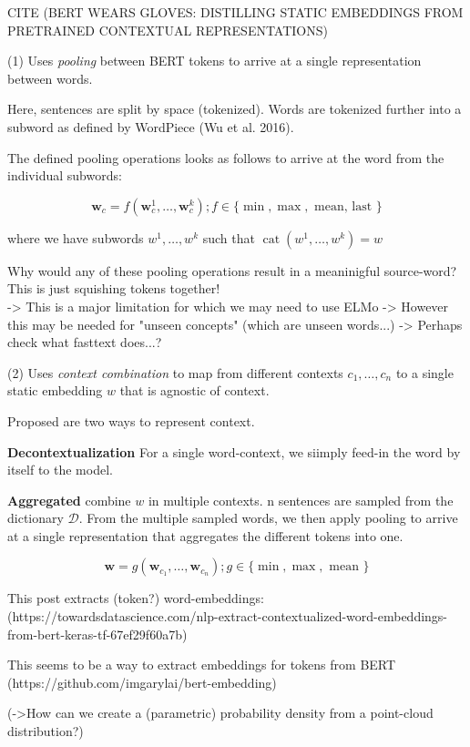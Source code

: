 \documentclass[a4paper,12pt,twoside,openright]{report}
\begin{document}
CITE (BERT WEARS GLOVES: DISTILLING STATIC EMBEDDINGS FROM PRETRAINED CONTEXTUAL REPRESENTATIONS)

(1) Uses \textit{pooling} between BERT tokens to arrive at a single representation between words.

Here, sentences are split by space (tokenized).
Words are tokenized further into a subword as defined by WordPiece (Wu et al. 2016).

The defined pooling operations looks as follows to arrive at the word from the individual subwords:

$$
\mathbf{w}_{c}=f\left(\mathbf{w}_{c}^{1}, \ldots, \mathbf{w}_{c}^{k}\right) ; f \in\{\min , \max , \text { mean, last }\}
$$

where we have subwords $w^{1},  \ldots, w^{k}$ such that $\operatorname{cat}\left(w^{1}, \ldots, w^{k}\right)=w$

Why would any of these pooling operations result in a meaninigful source-word? 
This is just squishing tokens together! \\

-> This is a major limitation for which we may need to use ELMo
-> However this may be needed for "unseen concepts" (which are unseen words...)
-> Perhaps check what fasttext does...?


(2) Uses \textit{context combination} to map from different contexts $c_1, \ldots, c_n$ to a single static embedding $w$ that is agnostic of context.

Proposed are two ways to represent context.

\textbf{Decontextualization} For a single word-context, we siimply feed-in the word by itself to the model.

\textbf{Aggregated} combine $w$ in multiple contexts.
n sentences are sampled from the dictionary $\mathcal{D}$.
From the multiple sampled words, we then apply pooling to arrive at a single representation that aggregates the different tokens into one.

$$
\mathbf{w}=g\left(\mathbf{w}_{c_{1}}, \dots, \mathbf{w}_{c_{n}}\right) ; g \in\{\min , \max , \text { mean }\}
$$


This post extracts (token?) word-embeddings: 
(https://towardsdatascience.com/nlp-extract-contextualized-word-embeddings-from-bert-keras-tf-67ef29f60a7b)

This seems to be a way to extract embeddings for tokens from BERT
(https://github.com/imgarylai/bert-embedding)

(->How can we create a (parametric) probability density from a point-cloud distribution?)
\end{document}
